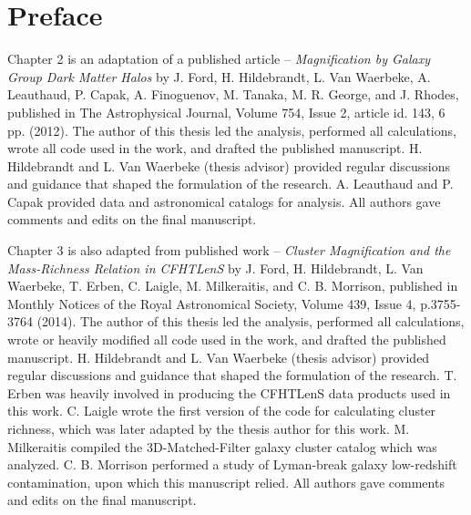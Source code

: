 
\chapter{Preface}
\label{preface}

Chapter 2 is an adaptation of a published article -- {\it Magnification by Galaxy Group Dark Matter Halos} by J. Ford, H. Hildebrandt, L. Van Waerbeke, A. Leauthaud, P. Capak, A. Finoguenov, M. Tanaka, M. R. George, and J. Rhodes, published in The Astrophysical Journal, Volume 754, Issue 2, article id. 143, 6 pp. (2012). The author of this thesis led the analysis, performed all calculations, wrote all code used in the work, and drafted the published manuscript. H. Hildebrandt and L. Van Waerbeke (thesis advisor) provided regular discussions and guidance that shaped the formulation of the research. A. Leauthaud and P. Capak provided data and astronomical catalogs for analysis. All authors gave comments and edits on the final manuscript.


Chapter 3 is also adapted from published work -- {\it Cluster Magnification and the Mass-Richness Relation in CFHTLenS} by J. Ford, H. Hildebrandt, L. Van Waerbeke, T. Erben, C. Laigle, M. Milkeraitis, and C. B. Morrison, published in Monthly Notices of the Royal Astronomical Society, Volume 439, Issue 4, p.3755-3764 (2014). The author of this thesis led the analysis, performed all calculations, wrote or heavily modified all code used in the work, and drafted the published manuscript. H. Hildebrandt and L. Van Waerbeke (thesis advisor) provided regular discussions and guidance that shaped the formulation of the research. T. Erben was heavily involved in producing the CFHTLenS data products used in this work. C. Laigle wrote the first version of the code for calculating cluster richness, which was later adapted by the thesis author for this work. M. Milkeraitis compiled the 3D-Matched-Filter galaxy cluster catalog which was analyzed. C. B. Morrison performed a study of Lyman-break galaxy low-redshift contamination, upon which this manuscript relied. All authors gave comments and edits on the final manuscript.


